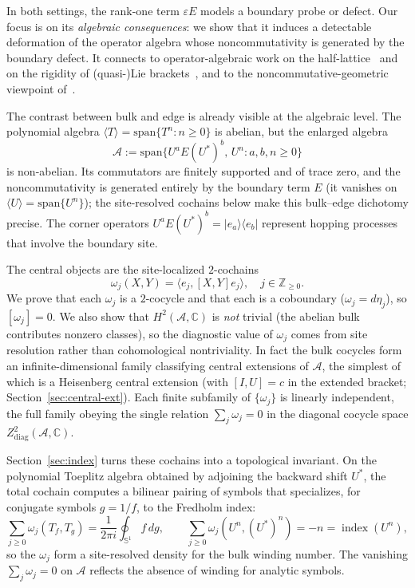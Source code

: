 \documentclass[10pt]{amsart}
\newcommand{\1}{{\mathbb{I}}}
\newcommand{\ind}{\operatorname{index}}
\numberwithin{equation}{section}
\begin{document}
In both settings, the rank-one term $\varepsilon E$ models a boundary probe or defect. Our
focus is on its \emph{algebraic consequences}: we show that it induces a detectable deformation
of the operator algebra whose noncommutativity is generated by the boundary defect.
It connects to operator-algebraic work on the half-lattice~\cite{Athmouni-half} and on
the rigidity of (quasi-)Lie brackets~\cite{Athmouni-QL}, and to the
noncommutative-geometric viewpoint of~\cite{Connes94}.

The contrast between bulk and edge is already visible at the algebraic level. The polynomial algebra
$\langle T \rangle = \mathrm{span}\{T^n : n \ge 0\}$ is abelian, but the enlarged algebra
\[
\mathcal{A} := \mathrm{span}\{U^a E (U^*)^b,\, U^n : a,b,n \ge 0\}
\]
is non-abelian. Its commutators are finitely supported and of trace zero, and the
noncommutativity is generated entirely by the boundary term $E$ (it vanishes on
$\langle U\rangle=\mathrm{span}\{U^n\}$); the site-resolved cochains below make this bulk--edge dichotomy precise.
The corner operators $U^a E (U^*)^b = |e_a\rangle\langle e_b|$
represent hopping processes that involve the boundary site.

The central objects are the site-localized $2$-cochains
\[
\omega_j(X,Y) = \langle e_j, [X,Y] e_j \rangle, \quad j \in \mathbb{Z}_{\ge 0}.
\]
We prove that each $\omega_j$ is a $2$-cocycle and that each is a coboundary
($\omega_j = d\eta_j$), so $[\omega_j] = 0$. We also show that $H^2(\mathcal{A},\mathbb{C})$ is
\emph{not} trivial (the abelian bulk contributes nonzero classes), so the diagnostic value
of $\omega_j$ comes from site resolution rather than cohomological nontriviality. In fact the
bulk cocycles form an infinite-dimensional family classifying central extensions of
$\mathcal{A}$, the simplest of which is a Heisenberg central extension (with $[I,U]=c$ in the
extended bracket; Section~\ref{sec:central-ext}). Each finite
subfamily of $\{\omega_j\}$ is linearly independent, the full family obeying the single relation
$\sum_j \omega_j = 0$ in the diagonal cocycle space $Z^2_{\mathrm{diag}}(\mathcal{A},\mathbb{C})$.

\medskip
Section~\ref{sec:index} turns these cochains into a topological invariant. On the
polynomial Toeplitz algebra obtained by adjoining the backward shift $U^*$, the total cochain
computes a bilinear pairing of symbols that specializes, for conjugate symbols $g=1/f$, to the
Fredholm index:
\[
\sum_{j\ge0}\omega_j(T_f,T_g)=\frac{1}{2\pi i}\oint_{\mathbb{S}^1} f\,dg,
\qquad \sum_{j\ge0}\omega_j(U^n,(U^*)^n)=-n=\ind(U^n),
\]
so the $\omega_j$ form a site-resolved density for the bulk winding number. The vanishing $\sum_j\omega_j=0$ on $\mathcal{A}$ reflects
the absence of winding for analytic symbols.
\end{document}
